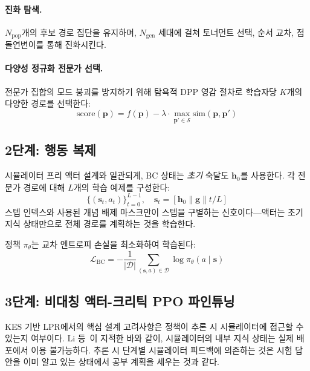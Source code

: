 \documentclass[11pt,a4paper]{article}
\newcommand{\bc}{\mathrm{BC}}
\begin{document}
\paragraph{진화 탐색.} $N_{\text{pop}}$개의 후보 경로 집단을 유지하며, $N_{\text{gen}}$ 세대에 걸쳐 토너먼트 선택, 순서 교차, 점 돌연변이를 통해 진화시킨다.

\paragraph{다양성 정규화 전문가 선택.} 전문가 집합의 모드 붕괴를 방지하기 위해 탐욕적 DPP 영감 절차로 학습자당 $K$개의 다양한 경로를 선택한다:
\begin{equation}
    \text{score}(\mathbf{p}) = f(\mathbf{p}) - \lambda \cdot \max_{\mathbf{p}' \in \mathcal{S}} \text{sim}(\mathbf{p}, \mathbf{p}')
\end{equation}

\subsection{2단계: 행동 복제}

시뮬레이터 프리 액터 설계와 일관되게, BC 상태는 \emph{초기} 숙달도 $\mathbf{h}_0$를 사용한다. 각 전문가 경로에 대해 $L$개의 학습 예제를 구성한다:
\begin{equation}
    \{(\mathbf{s}_t, a_t)\}_{t=0}^{L-1}, \quad \mathbf{s}_t = [\mathbf{h}_0 \| \mathbf{g} \| t/L]
\end{equation}
스텝 인덱스와 사용된 개념 배제 마스크만이 스텝을 구별하는 신호이다---액터는 초기 지식 상태만으로 전체 경로를 계획하는 것을 학습한다.

정책 $\pi_\theta$는 교차 엔트로피 손실을 최소화하여 학습된다:
\begin{equation}
    \mathcal{L}_{\bc} = -\frac{1}{|\mathcal{D}|} \sum_{(\mathbf{s}, a) \in \mathcal{D}} \log \pi_\theta(a \mid \mathbf{s})
\end{equation}

\subsection{3단계: 비대칭 액터-크리틱 PPO 파인튜닝}

KES 기반 LPR에서의 핵심 설계 고려사항은 정책이 추론 시 시뮬레이터에 접근할 수 있는지 여부이다. Li 등~\cite{li2024privileged}이 지적한 바와 같이, 시뮬레이터의 내부 지식 상태는 실제 배포에서 이용 불가능하다. 추론 시 단계별 시뮬레이터 피드백에 의존하는 것은 시험 답안을 이미 알고 있는 상태에서 공부 계획을 세우는 것과 같다.
\end{document}
